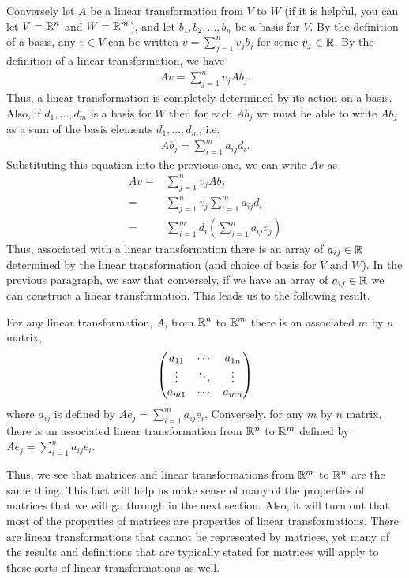 Conversely let $A$ be a linear transformation from $V$ to $W$ (if it
is helpful, you can let $V=\mathbb{R}^n$ and $W=\mathbb{R}^m$), and let $b_1, b_2,
..., b_n$ be a basis for $V$. By the definition of a basis, any $v \in
V$ can be written $v = \sum_{j=1}^n v_j b_j$ for some $v_j
\in \mathbb{R}$. By the definition of a linear transformation, we have
\begin{align*}
  A v = \sum_{j=1}^n v_j A b_j. 
\end{align*}
Thus, a linear transformation is completely determined by its action
on a basis. Also, if $d_1, ..., d_m$ is a basis for $W$ then for each
$A b_j$ we must be able to write $A b_j$ as a sum of the basis
elements $d_1, ..., d_m$, i.e.\
\begin{align*}
  A b_j = \sum_{i=1}^m a_{ij} d_i.
\end{align*}
Substituting this equation into the previous one, we can write $Av$ as
\begin{align*}
  Av = & \sum_{j=1}^n v_j A b_j \\
  = & \sum_{j=1}^n v_j \sum_{i=1}^m a_{ij} d_i \\
  = & \sum_{i=1}^m d_i \left( \sum_{j=1}^n a_{ij} v_j \right) 
\end{align*}
Thus, associated with a linear transformation there is an array of
$a_{ij} \in \mathbb{R}$ determined by the linear transformation (and choice of
basis for $V$ and $W$). In the previous paragraph, we saw that
conversely, if we have an array of $a_{ij} \in \mathbb{R}$ we can construct a
linear transformation. This leads us to the following result.
\begin{theorem}
  For any linear transformation, $A$, from $\mathbb{R}^n$ to $\mathbb{R}^m$ there is an
  associated $m$ by $n$ matrix,
  \[ 
  \begin{pmatrix} {a}_{11} & \cdots & {a}_{1n} \\ \vdots & \ddots & \vdots \\ {a}_{m1} & \cdots & {a}_{mn} \end{pmatrix}
  \]
  where $a_{ij}$ is defined by $A e_j = \sum_{i=1}^m a_{ij}
  e_i$. Conversely, for any $m$ by $n$ matrix, there is an associated
  linear transformation from $\mathbb{R}^n$ to $\mathbb{R}^m$ defined by $A e_j =
  \sum_{i=1}^n a_{ij} e_i$.
\end{theorem}
Thus, we see that matrices and linear transformations from $\mathbb{R}^m$ to
$\mathbb{R}^n$ are the same thing. This fact will help us make sense of many
of the properties of matrices that we will go through in the next
section. Also, it will turn out that most of the properties of
matrices are properties of linear transformations. There are linear
transformations that cannot be represented by matrices, yet many of
the results and definitions that are typically stated for matrices
will apply to these sorts of linear transformations as well.

